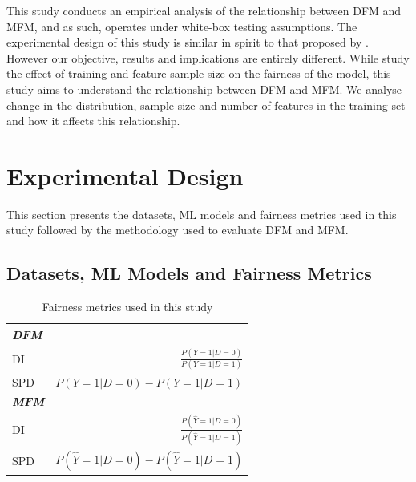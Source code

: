 \documentclass{article}
\begin{document}

This study conducts an empirical analysis of the relationship between
DFM and MFM, and as such, operates under white-box testing
assumptions. The experimental design of this study is similar in
spirit to that proposed by \citeauthor{zhang2021ignorance}. However
our objective, results and implications are entirely different. While
\citeauthor{zhang2021ignorance} study the effect of training and
feature sample size on the fairness of the model, this study aims to
understand the relationship between DFM and MFM. We analyse change in
the distribution, sample size and number of features in the training
set and how it affects this relationship.

\section{Experimental Design}\label{sec:method}

This section presents the datasets, ML models and fairness metrics
used in this study followed by the methodology used to evaluate DFM
and MFM.

\subsection{Datasets, ML Models and Fairness Metrics}\label{sec:method-parameters}

\begin{table}
  \centering
  \begin{tabular}{l r}
    \toprule
    \textbf{\emph{DFM}}\\
    \midrule
    DI & \(\displaystyle \frac{P(Y=1|D=0)}{P(Y=1|D=1)}\)\\
    SPD & \(\displaystyle P(Y=1|D=0)-P(Y=1|D=1)\)\\
    \midrule
    \textbf{\emph{MFM}}\\
    \midrule
    DI & \(\displaystyle \frac{P(\hat{Y}=1|D=0)}{P(\hat{Y}=1|D=1)}\)\\
    SPD & \(\displaystyle P(\hat{Y}=1|D=0)-P(\hat{Y}=1|D=1)\)\\
    \bottomrule
  \end{tabular}
  \caption{Fairness metrics used in this study}
  \label{tab:fairness-metrics}
\end{table}
\end{document}
